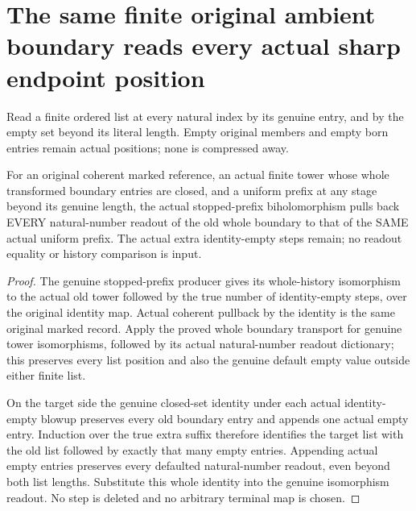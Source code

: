 \section{The same finite original ambient boundary reads every actual sharp endpoint position}

Read a finite ordered list at every natural index by its genuine entry,
and by the empty set beyond its literal length. Empty original members
and empty born entries remain actual positions; none is compressed away.

\begin{lemma}
\label{hir:sharp-actual-curve-stopped-prefix-whole-boundary-readout}
\leanok
For an original coherent marked reference, an actual finite tower whose
whole transformed boundary entries are closed, and a uniform prefix at
any stage beyond its genuine length, the actual stopped-prefix
biholomorphism pulls back EVERY natural-number readout of the old whole
boundary to that of the SAME actual uniform prefix. The actual extra
identity-empty steps remain; no readout equality or history comparison is
input.
\end{lemma}
\begin{proof}
The genuine stopped-prefix producer gives its whole-history isomorphism
to the actual old tower followed by the true number of identity-empty
steps, over the original identity map. Actual coherent pullback by the
identity is the same original marked record. Apply the proved whole
boundary transport for genuine tower isomorphisms, followed by its actual
natural-number readout dictionary; this preserves every list position and
also the genuine default empty value outside either finite list.

On the target side the genuine closed-set identity under each actual
identity-empty blowup preserves every old boundary entry and appends one
actual empty entry. Induction over the true extra suffix therefore
identifies the target list with the old list followed by exactly that many
empty entries. Appending actual empty entries preserves every defaulted
natural-number readout, even beyond both list lengths. Substitute this
whole identity into the genuine isomorphism readout. No step is deleted
and no arbitrary terminal map is chosen.
\end{proof}

